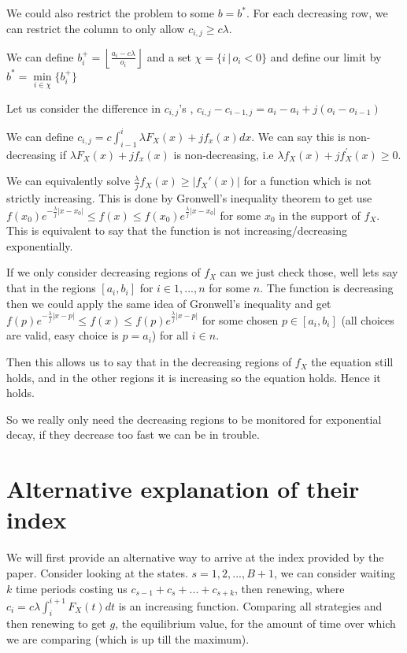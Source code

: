 \documentclass[a4paper,10pt]{article}
\newcommand{\floor}[1]{\left \lfloor #1 \right \rfloor}
\theoremstyle{definition}
\theoremstyle{definition}
\theoremstyle{remark}
\theoremstyle{definition}
\begin{document}
We could also restrict the problem to some $b=b^{*}$. For each decreasing row, we can restrict the column to only allow $c_{i,j} \geq c \lambda$.

We can define $b_{i}^{+}=\floor{\frac{a_{i}-c \lambda}{o_{i}}}$ and a set $\chi=\{i \, | \, o_{i}<0 \}$ and define our limit by $b^{*}=\min\limits_{i \in \chi} \{b_{i}^{+} \}$

Let us consider the difference in $c_{i,j}$'s , $c_{i,j}-c_{i-1,j}=a_{i}-a_{i}+j(o_{i}-o_{i-1})$

We can define $c_{i,j}=c \int_{i-1}^{i} \lambda F_{X}(x)+j f_{x}(x) dx$. We can say this is non-decreasing if $\lambda F_{X}(x)+ j f_{x}(x)$ is non-decreasing, i.e $\lambda f_{X}(x) + j f^{'}_{{X}}(x) \geq 0$.


We can equivalently solve $\frac{\lambda}{j}f_{X}(x) \geq |f_{X}'(x)|$ for a function which is not strictly increasing. This is done by Gronwell's inequality theorem to get use $f(x_{0})e^{-\frac{\lambda}{j}|x-x_{0}|} \leq f(x) \leq f(x_{0})e^{\frac{\lambda}{j}|x-x_{0}|}$ for some $x_{0}$ in the support of $f_{X}$. This is equivalent to say that the function is not increasing/decreasing exponentially.

If we only consider decreasing regions of $f_{X}$ can we just check those, well lets say that in the regions $[a_{i},b_{i}]$ for $i \in {1,...,n}$ for some $n$. The function is decreasing then we could apply the same idea of Gronwell's inequality and get $f(p)e^{-\frac{\lambda}{j}|x-p|} \leq f(x) \leq f(p)e^{\frac{\lambda}{j}|x-p|}$ for some chosen $p \in [a_{i},b_{i}]$ (all choices are valid, easy choice is $p=a_{i}$) for all $i \in n$.

Then this allows us to say that in the decreasing regions of $f_{X}$ the equation still holds, and in the other regions it is increasing so the equation holds. Hence it holds.

So we really only need the decreasing regions to be monitored for exponential decay, if they decrease too fast we can be in trouble.

\section{Alternative explanation of their index}
We will first provide an alternative way to arrive at the index provided by the paper. Consider looking at the states. $s=1,2,...,B+1$, we can consider waiting $k$ time periods costing us $c_{s-1}+c_{s}+...+c_{s+k}$, then renewing, where $c_{i}=c \lambda \int_{i}^{i+1} F_{X}(t) dt$ is an increasing function. Comparing all strategies and then renewing to get $g$, the equilibrium value, for the amount of time over which we are comparing (which is up till the maximum).
\end{document}
